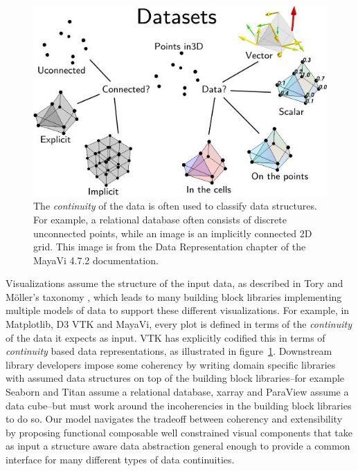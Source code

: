 \documentclass[../main.tex]{subfiles}
\begin{document}
\begin{figure}[H]
    \includegraphics[width=1\textwidth]{figures/intro/dataset_diagram.png}
    \caption{The \textit{continuity} of the data is often used to classify data structures. For example, a relational database often consists of discrete unconnected points, while an image is an implicitly connected 2D grid. This image is from the Data Representation chapter of the MayaVi 4.7.2 documentation.\cite{DataRepresentationMayavi}}
    \label{fig:intro:data:format}
\end{figure}

Visualizations assume the structure of the input data, as described in Tory and Möller's taxonomy \cite{toryRethinkingVisualizationHighlevel2004}, which leads to many building block libraries implementing multiple models of data to support these different visualizations. For example, in Matplotlib, D3\cite{bostockDataDrivenDocuments2011} VTK \cite{hanwellVisualizationToolkitVTK2015,geveciVTK2012} and MayaVi\cite{RamachandranMayaVI2011}, every plot is defined in terms of the \textit{continuity} of the data it expects as input. VTK has explicitly codified this in terms of \textit{continuity} based data representations, as illustrated in figure~\ref{fig:intro:data:format}. Downstream library developers impose some coherency by writing domain specific libraries with assumed data structures on top of the building block libraries--for example Seaborn\cite{waskom2020seaborn} and Titan\cite{brianwylieUnifiedToolkitInformation2009} assume a relational database, xarray\cite{hoyer2017xarray} and ParaView\cite{ahrens2005paraview} assume a data cube--but must work around the incoherencies in the building block libraries to do so. Our model navigates the tradeoff between coherency and extensibility by proposing functional composable well constrained visual components that take as input a structure aware data abstraction general enough to provide a common interface for many different types of data continuities. 
\end{document}
